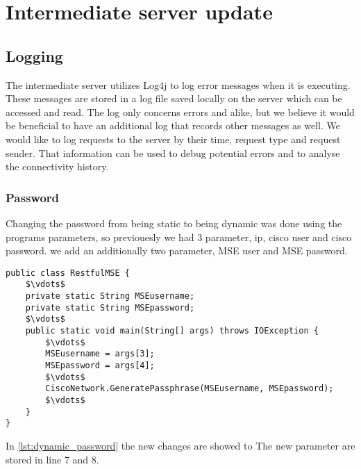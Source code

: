\section{Intermediate server update}

\subsection*{Logging}
The intermediate server utilizes Log4j \cite{log4j} to log error messages when it is executing. These messages are stored in a log file saved locally on the server which can be accessed and read. The log only concerns errors and alike, but we believe it would be beneficial to have an additional log that records other messages as well. We would like to log requests to the server by their time, request type and request sender. That information can be used to debug potential errors and to analyse the connectivity history. 


\subsubsection*{Password}
Changing the password from being static to being dynamic was done using the programs parameters, so previouesly we had 3 parameter, ip, cisco user and cisco password. we add an additionally two parameter, MSE user and MSE password.

\begin{lstlisting}[caption={Failed Connection snapshot},label={lst:dynamic_password},language=inc_Java, mathescape]
public class RestfulMSE {
	$\vdots$
	private static String MSEusername;
    private static String MSEpassword;
    $\vdots$
    public static void main(String[] args) throws IOException {
    	$\vdots$
   		MSEusername = args[3];
    	MSEpassword = args[4];
    	$\vdots$
    	CiscoNetwork.GeneratePassphrase(MSEusername, MSEpassword);
    	$\vdots$
    }
}
\end{lstlisting}

In \cref{lst:dynamic_password} the new changes are showed to 
The new parameter are stored in line 7 and 8. 
